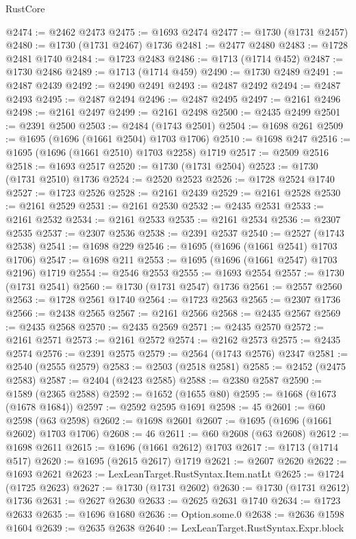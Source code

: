 \begin{lexlean}{RustCore}
\begin{coremodule}
@2474 := @2462 @2473
@2475 := @1693 @2474
@2477 := @1730 (@1731 @2457)
@2480 := @1730 (@1731 @2467) @1736
@2481 := @2477 @2480
@2483 := @1728 @2481 @1740
@2484 := @1723 @2483
@2486 := @1713 (@1714 @452)
@2487 := @1730 @2486
@2489 := @1713 (@1714 @459)
@2490 := @1730 @2489
@2491 := @2487 @2439
@2492 := @2490 @2491
@2493 := @2487 @2492
@2494 := @2487 @2493
@2495 := @2487 @2494
@2496 := @2487 @2495
@2497 := @2161 @2496
@2498 := @2161 @2497
@2499 := @2161 @2498
@2500 := @2435 @2499
@2501 := @2391 @2500
@2503 := @2484 (@1743 @2501)
@2504 := @1698 @261
@2509 := @1695 (@1696 (@1661 @2504) @1703 @1706)
@2510 := @1698 @247
@2516 := @1695 (@1696 (@1661 @2510) @1703 @2258) @1719
@2517 := @2509 @2516
@2518 := @1693 @2517
@2520 := @1730 (@1731 @2504)
@2523 := @1730 (@1731 @2510) @1736
@2524 := @2520 @2523
@2526 := @1728 @2524 @1740
@2527 := @1723 @2526
@2528 := @2161 @2439
@2529 := @2161 @2528
@2530 := @2161 @2529
@2531 := @2161 @2530
@2532 := @2435 @2531
@2533 := @2161 @2532
@2534 := @2161 @2533
@2535 := @2161 @2534
@2536 := @2307 @2535
@2537 := @2307 @2536
@2538 := @2391 @2537
@2540 := @2527 (@1743 @2538)
@2541 := @1698 @229
@2546 := @1695 (@1696 (@1661 @2541) @1703 @1706)
@2547 := @1698 @211
@2553 := @1695 (@1696 (@1661 @2547) @1703 @2196) @1719
@2554 := @2546 @2553
@2555 := @1693 @2554
@2557 := @1730 (@1731 @2541)
@2560 := @1730 (@1731 @2547) @1736
@2561 := @2557 @2560
@2563 := @1728 @2561 @1740
@2564 := @1723 @2563
@2565 := @2307 @1736
@2566 := @2438 @2565
@2567 := @2161 @2566
@2568 := @2435 @2567
@2569 := @2435 @2568
@2570 := @2435 @2569
@2571 := @2435 @2570
@2572 := @2161 @2571
@2573 := @2161 @2572
@2574 := @2162 @2573
@2575 := @2435 @2574
@2576 := @2391 @2575
@2579 := @2564 (@1743 @2576) @2347
@2581 := @2540 (@2555 @2579)
@2583 := @2503 (@2518 @2581)
@2585 := @2452 (@2475 @2583)
@2587 := @2404 (@2423 @2585)
@2588 := @2380 @2587
@2590 := @1589 (@2365 @2588)
@2592 := @1652 (@1655 @80)
@2595 := @1668 (@1673 (@1678 @1684))
@2597 := @2592 @2595 @1691
@2598 := 45
@2601 := @60 @2598 (@63 @2598)
@2602 := @1698 @2601
@2607 := @1695 (@1696 (@1661 @2602) @1703 @1706)
@2608 := 46
@2611 := @60 @2608 (@63 @2608)
@2612 := @1698 @2611
@2615 := @1696 (@1661 @2612) @1703
@2617 := @1713 (@1714 @517)
@2620 := @1695 (@2615 @2617) @1719
@2621 := @2607 @2620
@2622 := @1693 @2621
@2623 := LexLeanTarget.RustSyntax.Item.natLt
@2625 := @1724 (@1725 @2623)
@2627 := @1730 (@1731 @2602)
@2630 := @1730 (@1731 @2612) @1736
@2631 := @2627 @2630
@2633 := @2625 @2631 @1740
@2634 := @1723 @2633
@2635 := @1696 @1680
@2636 := Option.some.{0}
@2638 := @2636 @1598 @1604
@2639 := @2635 @2638
@2640 := LexLeanTarget.RustSyntax.Expr.block

\end{coremodule}
\end{lexlean}
